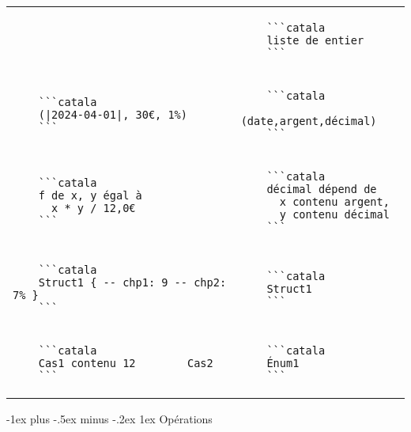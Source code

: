 \documentclass{article}
\makeatletter
\newcommand\articlenormalsize{\fontsize{10pt}{12pt}\selectfont}
\renewcommand{\section}{\@startsection{section}{1}{0mm}%
                                {-1ex plus -.5ex minus -.2ex}%
                                {1ex}%
                                {\normalfont\articlenormalsize\bfseries}}
\newenvironment{catala}{%
  \VerbatimEnvironment
  \let\FV@ListVSpace\relax
  \begin{verbatim}}%
 {\end{verbatim}}
\makeatother
\begin{document}
\begin{multicols}{3}
\begin{tabular}{@{}p{\cola}p{\colb}@{}}
  & \begin{catala}
    ```catala
    liste de entier
    ```
  \end{catala}
  \\
  \begin{catala}
    ```catala
    (|2024-04-01|, 30€, 1%
    ```
  \end{catala}
  & \begin{catala}
    ```catala
    (date,argent,décimal)
    ```
  \end{catala}
  \\
  \begin{catala}
    ```catala
    f de x, y égal à
      x * y / 12,0€
    ```
  \end{catala}
  & \begin{catala}
    ```catala
    décimal dépend de
      x contenu argent,
      y contenu décimal
    ```
  \end{catala}

  \\
  
  \begin{catala}
    ```catala
    Struct1 { -- chp1: 9 -- chp2: 7%
    ```
  \end{catala}
  & \begin{catala}
    ```catala
    Struct1
    ```
  \end{catala}

  \\
  
  \begin{catala}
    ```catala
    Cas1 contenu 12        Cas2
    ```
  \end{catala}
  & \begin{catala}
    ```catala
    Énum1
    ```
  \end{catala}
  \\
\end{tabular}

\section{Opérations}


\end{multicols}
\end{document}
